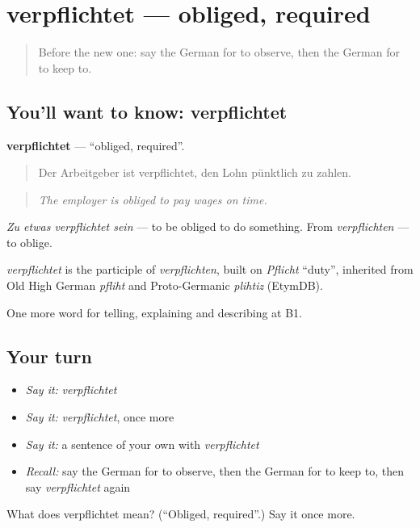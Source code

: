 \section[verpflichtet]{verpflichtet — obliged, required}

\label{lesson:GE-C381-verpflichtet}



\begin{quote}
Before the new one: say the German for to observe, then the German for to keep to.
\end{quote}

\subsection*{You'll want to know: verpflichtet}
\textbf{verpflichtet} — \textquotedblleft{}obliged, required\textquotedblright{}.

\begin{quote}
Der Arbeitgeber ist verpflichtet, den Lohn pünktlich zu zahlen.
\end{quote}

\begin{quote}
\emph{The employer is obliged to pay wages on time.}
\end{quote}

\emph{Zu etwas verpflichtet sein} — to be obliged to do something. From \emph{verpflichten} — to oblige.

\begin{cousinweb}
\emph{verpflichtet} is the participle of \emph{verpflichten}, built on \emph{Pflicht} \textquotedblleft{}duty\textquotedblright{}, inherited from Old High German \emph{pfliht} and Proto-Germanic \emph{plihtiz} (EtymDB).
\end{cousinweb}

\begin{grammarlens}[title={What you've built}]
One more word for telling, explaining and describing at B1.
\end{grammarlens}

\subsection*{Your turn}
\begin{itemize}
\raggedright
  \item \emph{Say it:} \emph{verpflichtet}
  \item \emph{Say it:} \emph{verpflichtet}, once more
  \item \emph{Say it:} a sentence of your own with \emph{verpflichtet}
  \item \emph{Recall:} say the German for to observe, then the German for to keep to, then say \emph{verpflichtet} again
\end{itemize}

\begin{tcolorbox}[breakable,colback=teal!4,colframe=teal!35!black,title={Before you move on}]
What does verpflichtet mean? (\textquotedblleft{}Obliged, required\textquotedblright{}.) Say it once more.
\end{tcolorbox}
